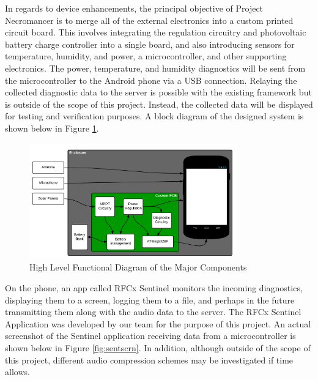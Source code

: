 \documentclass{article}
\numberwithin{figure}{section}
\numberwithin{equation}{section}
\begin{document}
{In regards to device enhancements, the principal objective of Project Necromancer is to merge all of the external electronics into a custom printed circuit board. This involves integrating the regulation circuitry and photovoltaic battery charge controller into a single board, and also introducing sensors for temperature, humidity, and power, a microcontroller, and other supporting electronics. The power, temperature, and humidity diagnostics will be sent from the microcontroller to the Android phone via a USB connection. Relaying the collected diagnostic data to the server is possible with the existing framework but is outside of the scope of this project. Instead, the collected data will be displayed for testing and verification purposes. A block diagram of the designed system is shown below in Figure \ref{fig:hldia}.

\begin{figure}[H]
  \centering
  \includegraphics[width=0.8\textwidth]{Highlevel}
  \caption{High Level Functional Diagram of the Major Components}
  \label{fig:hldia}
\end{figure}
\newpage

On the phone, an app called RFCx Sentinel monitors the incoming diagnostics, displaying them to a screen, logging them to a file, and perhaps in the future transmitting them along with the audio data to the server. The RFCx Sentinel Application was developed by our team for the purpose of this project. An actual screenshot of the Sentinel application receiving data from a microcontroller is shown below in Figure \ref{fig:sentscrn}. In addition, although outside of the scope of this project, different audio compression schemes may be investigated if time allows.

}
\end{document}
